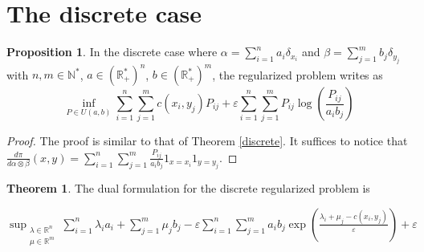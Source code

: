 \documentclass[12pt]{report}
\theoremstyle{definition}
\newtheorem{thm}[defi]{Theorem}
\newtheorem{prop}[defi]{Proposition}
\theoremstyle{remark}
\begin{document}
\newpage
\section{The discrete case}

\begin{prop}\label{discretereg}
	In the discrete case where $\alpha=\sum_{i=1}^n a_i \delta_{x_i}$ and $\beta=\sum_{j=1}^m b_j \delta_{y_j}$ with $n,m\in \mathbb N^*$, $a\in (\mathbb R_+^*)^n$, $b\in (\mathbb R_+^*)^m$, the regularized problem writes as \begin{equation*}
	\inf_{P\in U(a,b)} \sum_{i=1}^n\sum_{j=1}^m c(x_i,y_j)P_{ij} + \varepsilon \sum_{i=1}^n\sum_{j=1}^m P_{ij}\log\left(\frac{P_{ij}}{a_i b_j} \right)
	\end{equation*}
\end{prop}

\begin{proof}
	The proof is similar to that of Theorem \ref{discrete}. It suffices to notice that\\ $\displaystyle \frac{d\pi}{d\alpha\otimes \beta}(x,y)=\sum_{i=1}^n\sum_{j=1}^m \frac{P_{ij}}{a_i b_j} 1_{x=x_i}1_{y=y_j}$.
\end{proof}

\begin{thm}
	The dual formulation for the discrete regularized problem is 
	\begin{center}
		$\displaystyle \sup_{\substack{\lambda\in \mathbb R^n\\ \mu\in \mathbb R^m}} \sum_{i=1}^n \lambda_i a_i+\sum_{j=1}^m \mu_j b_j - \varepsilon \sum_{i=1}^n\sum_{j=1}^m a_i b_j \exp\left(\frac{\lambda_i+\mu_j-c(x_i,y_j)}{\varepsilon}\right) + \varepsilon$
	\end{center}
\end{thm}
\end{document}
